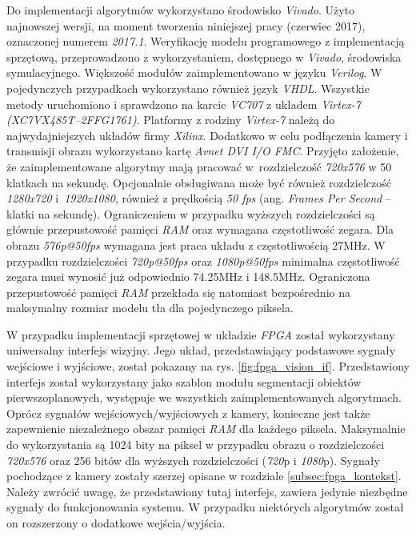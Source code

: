 Do implementacji algorytmów wykorzystano środowisko \textit{Vivado}. 
Użyto najnowszej wersji, na moment tworzenia niniejszej pracy (czerwiec 2017), oznaczonej numerem \textit{2017.1}. Weryfikację modelu programowego z implementacją sprzętową, przeprowadzono z wykorzystaniem, dostępnego w \textit{Vivado}, środowiska symulacyjnego.
Większość modułów zaimplementowano w języku \textit{Verilog}. 
W pojedynczych przypadkach wykorzystano również język \textit{VHDL}. 
Wszystkie metody uruchomiono i sprawdzono na karcie \textit{VC707} z układem \textit{Virtex-7 (\small{XC7VX485T--2FFG1761})}. Platformy z rodziny \textit{Virtex-7} należą do najwydajniejszych układów firmy \textit{Xilinx}. %
Dodatkowo w celu podłączenia kamery i transmisji obrazu wykorzystano kartę \textit{Avnet DVI I/O FMC}. 
Przyjęto założenie, że zaimplementowane algorytmy mają pracować w~rozdzielczość \textit{720x576} w 50 klatkach na sekundę. Opcjonalnie obsługiwana może być również rozdzielczość \textit{1280x720} i~\textit{1920x1080}, również z prędkością \textit{50 fps} (ang. \textit{Frames Per Second} -- klatki na sekundę). Ograniczeniem w przypadku wyższych rozdzielczości są głównie przepustowość pamięci \textit{RAM} oraz wymagana częstotliwość zegara. Dla obrazu \textit{576p@50fps} wymagana jest praca układu z częstotliwością \num{27}MHz. W przypadku rozdzielczości \textit{720p@50fps} oraz \textit{1080p@50fps} minimalna częstotliwość zegara musi wynosić już odpowiednio \num{74.25}MHz i \num{148.5}MHz. Ograniczona przepustowość pamięci \textit{RAM} przekłada się natomiast bezpośrednio na maksymalny rozmiar modelu tła dla pojedynczego piksela.

W przypadku implementacji sprzętowej w układzie \textit{FPGA} został wykorzystany uniwersalny interfejs wizyjny. 
Jego układ, przedstawiający podstawowe sygnały wejściowe i wyjściowe, został pokazany na rys. \ref{fig:fpga_vision_if}. Przedstawiony interfejs został wykorzystany jako szablon modułu segmentacji obiektów pierwszoplanowych, występuje we wszystkich zaimplementowanych algorytmach. 
Oprócz sygnałów wejściowych/wyjściowych z kamery, konieczne jest także zapewnienie niezależnego obszar pamięci \textit{RAM} dla każdego piksela.
Maksymalnie do wykorzystania są 1024 bity na piksel w przypadku obrazu o rozdzielczości \textit{720x576} oraz 256 bitów dla wyższych rozdzielczości (\textit{720}p i \textit{1080}p). 
Sygnały pochodzące z kamery zostały szerzej opisane w rozdziale \ref{subsec:fpga_kontekst}. 
Należy zwrócić uwagę, że przedstawiony tutaj interfejs, zawiera jedynie niezbędne sygnały do funkcjonowania systemu. 
W przypadku niektórych algorytmów został on rozszerzony o dodatkowe wejścia/wyjścia. 

